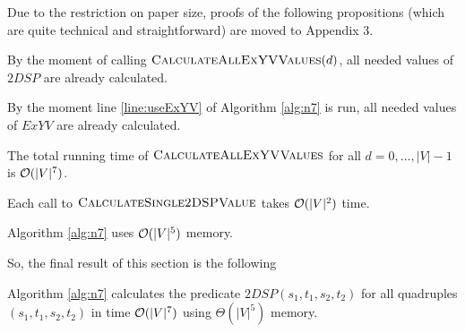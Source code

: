 Due to the restriction on paper size, proofs of the following propositions (which are quite technical and straightforward) are moved to Appendix 3.

\begin{proposition} \label{n7_corr1}
By the moment of calling $\textsc{CalculateAllExYVValues}(d)$, all needed values of $2DSP$ are already calculated.
\end{proposition}

\begin{proposition} \label{n7_corr2}
By the moment line \ref{line:useExYV} of Algorithm \ref{alg:n7} is run, all needed values of $ExYV$ are already calculated.
\end{proposition}

\begin{proposition} \label{n7_rt1}
The total running time of $\textsc{CalculateAllExYVValues}$ for all $d = 0, \ldots, |V|-1$ is $\mathcal{O}(|V|^7)$. 
\end{proposition}

\begin{proposition} \label{n7_rt2}
Each call to $\textsc{CalculateSingle2DSPValue}$ takes $\mathcal{O}(|V|^2)$ time.
\end{proposition}

\begin{proposition} \label{n7_m}
Algorithm \ref{alg:n7} uses $\mathcal{O}(|V|^5)$ memory.
\end{proposition}

So, the final result of this section is the following
\begin{theorem}
Algorithm \ref{alg:n7} calculates the predicate $2DSP(s_1, t_1, s_2, t_2)$ for all quadruples $(s_1, t_1, s_2, t_2)$ in time $\mathcal{O}(|V|^7)$ using $\Theta(|V|^5)$ memory. 
\end{theorem}
